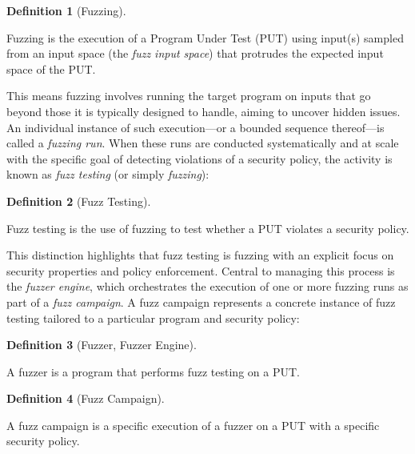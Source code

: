 \documentclass[
  a4paper,
  DIV=11,
  numbers=noendperiod]{scrreprt}
\theoremstyle{definition}
\newtheorem{definition}{Definition}[chapter]
\theoremstyle{remark}
\begin{document}
\begin{definition}[Fuzzing]\protect\hypertarget{def-fuzzing}{}\label{def-fuzzing}

Fuzzing is the execution of a Program Under Test (PUT) using input(s)
sampled from an input space (the \emph{fuzz input space}) that protrudes
the expected input space of the PUT.

\end{definition}

This means fuzzing involves running the target program on inputs that go
beyond those it is typically designed to handle, aiming to uncover
hidden issues. An individual instance of such execution---or a bounded
sequence thereof---is called a \emph{fuzzing run}. When these runs are
conducted systematically and at scale with the specific goal of
detecting violations of a security policy, the activity is known as
\emph{fuzz testing} (or simply \emph{fuzzing}):

\begin{definition}[Fuzz
Testing]\protect\hypertarget{def-fuzz-testing}{}\label{def-fuzz-testing}

Fuzz testing is the use of fuzzing to test whether a PUT violates a
security policy.

\end{definition}

This distinction highlights that fuzz testing is fuzzing with an
explicit focus on security properties and policy enforcement. Central to
managing this process is the \emph{fuzzer engine}, which orchestrates
the execution of one or more fuzzing runs as part of a \emph{fuzz
campaign}. A fuzz campaign represents a concrete instance of fuzz
testing tailored to a particular program and security policy:

\begin{definition}[Fuzzer, Fuzzer
Engine]\protect\hypertarget{def-fuzzer}{}\label{def-fuzzer}

A fuzzer is a program that performs fuzz testing on a PUT.

\end{definition}

\begin{definition}[Fuzz
Campaign]\protect\hypertarget{def-campaign}{}\label{def-campaign}

A fuzz campaign is a specific execution of a fuzzer on a PUT with a
specific security policy.

\end{definition}
\end{document}

